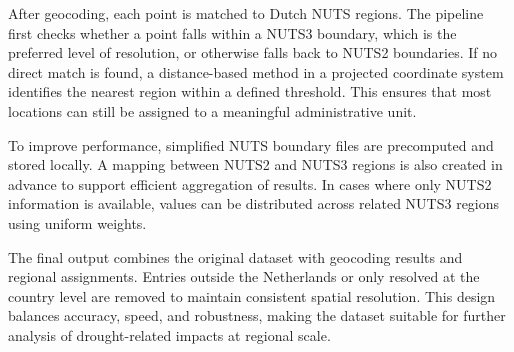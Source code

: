 After geocoding, each point is matched to Dutch NUTS regions. The pipeline first checks whether a point falls within a NUTS3 boundary, which is the preferred level of resolution, or otherwise falls back to NUTS2 boundaries. If no direct match is found, a distance-based method in a projected coordinate system identifies the nearest region within a defined threshold. This ensures that most locations can still be assigned to a meaningful administrative unit.

To improve performance, simplified NUTS boundary files are precomputed and stored locally. A mapping between NUTS2 and NUTS3 regions is also created in advance to support efficient aggregation of results. In cases where only NUTS2 information is available, values can be distributed across related NUTS3 regions using uniform weights.

The final output combines the original dataset with geocoding results and regional assignments. Entries outside the Netherlands or only resolved at the country level are removed to maintain consistent spatial resolution. This design balances accuracy, speed, and robustness, making the dataset suitable for further analysis of drought-related impacts at regional scale.